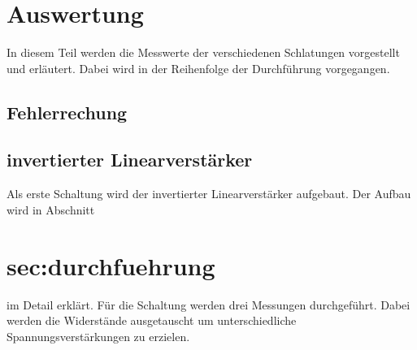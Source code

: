 \section{Auswertung}
\label{sec:auswertung}
In diesem Teil werden die Messwerte der verschiedenen Schlatungen vorgestellt und erläutert.
Dabei wird in der Reihenfolge der Durchführung vorgegangen.
\subsection{Fehlerrechung}

\subsection{invertierter Linearverstärker}
Als erste Schaltung wird der invertierter Linearverstärker aufgebaut.
Der Aufbau wird in Abschnitt \section{sec:durchfuehrung} im Detail erklärt.
Für die Schaltung werden drei Messungen durchgeführt.
Dabei werden die Widerstände ausgetauscht um unterschiedliche Spannungsverstärkungen zu erzielen.

